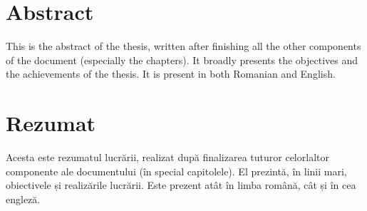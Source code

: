 \chapter*{Abstract}

\thispagestyle{front}

{
    \color{gray}
    This is the abstract of the thesis, written after finishing all the other components of the document (especially the chapters). It broadly presents the objectives and the achievements of the thesis. It is present in both Romanian and English. 
}

\newpage

\chapter*{Rezumat}

{
    \color{gray}
    Acesta este rezumatul lucrării, realizat după finalizarea tuturor celorlaltor componente ale documentului (în special capitolele). El prezintă, în linii mari, obiectivele și realizările lucrării. Este prezent atât în limba română, cât și în cea engleză.
}

\thispagestyle{front}